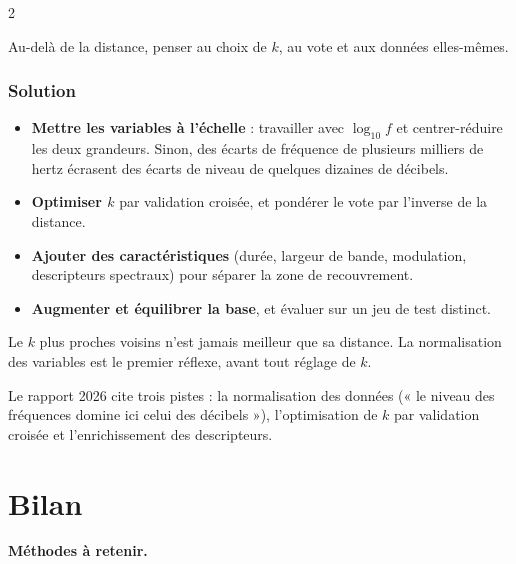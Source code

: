 \documentclass[11pt,a4paper]{article}
\providecommand{\tightlist}{\setlength{\itemsep}{0pt}\setlength{\parskip}{0pt}}
\begin{document}
\begin{indication}{2}

Au-delà de la distance, penser au choix de \(k\), au vote et aux données elles-mêmes.

\end{indication}

\hypertarget{solution-49}{%
\subsubsection{Solution}\label{solution-49}}

\begin{itemize}
\tightlist
\item
  \textbf{Mettre les variables à l'échelle} : travailler avec \(\log_{10} f\) et centrer-réduire les deux grandeurs. Sinon, des écarts de fréquence de plusieurs milliers de hertz écrasent des écarts de niveau de quelques dizaines de décibels.
\item
  \textbf{Optimiser \(k\)} par validation croisée, et pondérer le vote par l'inverse de la distance.
\item
  \textbf{Ajouter des caractéristiques} (durée, largeur de bande, modulation, descripteurs spectraux) pour séparer la zone de recouvrement.
\item
  \textbf{Augmenter et équilibrer la base}, et évaluer sur un jeu de test distinct.
\end{itemize}

\begin{methode}

Le \(k\) plus proches voisins n'est jamais meilleur que sa distance. La normalisation des variables est le premier réflexe, avant tout réglage de \(k\).

\end{methode}

\begin{jury}

Le rapport 2026 cite trois pistes : la normalisation des données (« le niveau des fréquences domine ici celui des décibels »), l'optimisation de \(k\) par validation croisée et l'enrichissement des descripteurs.

\end{jury}

\hypertarget{bilan}{%
\section{Bilan}\label{bilan}}

\textbf{Méthodes à retenir.}
\end{document}

